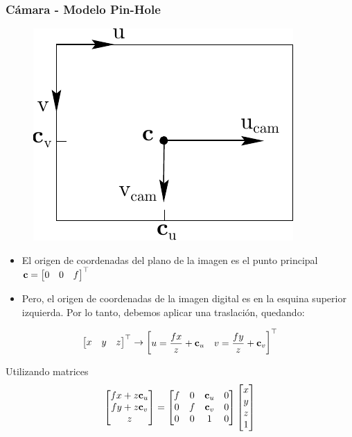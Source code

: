 \begin{frame}
    \frametitle{Cámara - Modelo Pin-Hole}   
    \footnotesize
    
    \begin{figure}[!h]
        \includegraphics[width=0.2\columnwidth]{images/camera/principal_point_coordinates.pdf}
    \end{figure}

    \begin{itemize}
        \item El origen de coordenadas del plano de la imagen es el punto principal $\boldsymbol{\mathbf{c}} = \begin{bmatrix}0 & 0 & f\end{bmatrix}^{\top}$
        \item Pero, el origen de coordenadas de la imagen digital es en la esquina superior izquierda. Por lo tanto, debemos aplicar una traslación, quedando:
    \end{itemize}
    

    
    \begin{equation}
        \begin{bmatrix}x & y & z\end{bmatrix}^{\top} \rightarrow  \begin{bmatrix} u=\dfrac{fx}{z} + \boldsymbol{\mathbf{c}}_{u}& v=\dfrac{fy}{z} + \boldsymbol{\mathbf{c}}_{v}\end{bmatrix}^{\top}
    \end{equation}

    Utilizando matrices
    \begin{equation}
    \begin{bmatrix}
        fx+z\boldsymbol{\mathbf{c}}_{u}\\
        fy+z\boldsymbol{\mathbf{c}}_{v}\\
        z
    \end{bmatrix}
    =
    \begin{bmatrix}
        f & 0 & \boldsymbol{\mathbf{c}}_{u} & 0\\
        0 & f & \boldsymbol{\mathbf{c}}_{v} & 0\\
        0 & 0 & 1 & 0
    \end{bmatrix}
    \begin{bmatrix}
        x\\
        y\\
        z\\
        1
    \end{bmatrix}
    \end{equation}
\end{frame}

